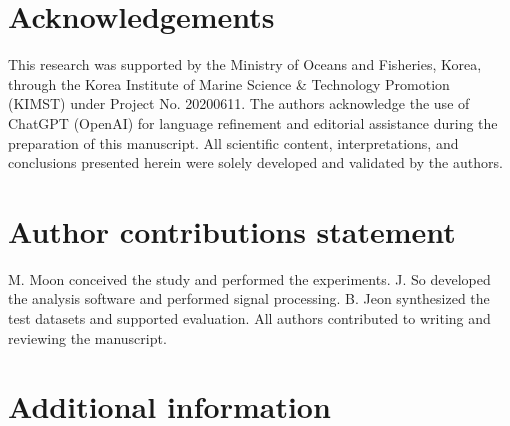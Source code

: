 \documentclass[10pt]{wlscirep}
\begin{document}

\section*{Acknowledgements}

This research was supported by the Ministry of Oceans and Fisheries, Korea, through the Korea Institute of Marine Science \& Technology Promotion (KIMST) under Project No. 20200611. The authors acknowledge the use of ChatGPT (OpenAI) for language refinement and editorial assistance during the preparation of this manuscript. All scientific content, interpretations, and conclusions presented herein were solely developed and validated by the authors.

\section*{Author contributions statement}
M. Moon conceived the study and performed the experiments. J. So developed the analysis software and performed signal processing. B. Jeon synthesized the test datasets and supported evaluation. All authors contributed to writing and reviewing the manuscript.



\section*{Additional information}


\end{document}
